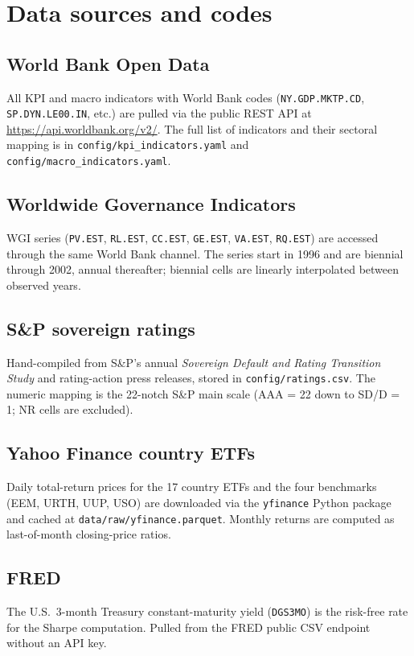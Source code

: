 \section{Data sources and codes}\label{app:data}

\subsection*{World Bank Open Data}

All KPI and macro indicators with World Bank codes (\texttt{NY.GDP.MKTP.CD}, \texttt{SP.DYN.LE00.IN}, etc.) are pulled via the public REST API at \url{https://api.worldbank.org/v2/}. The full list of indicators and their sectoral mapping is in \texttt{config/kpi\_indicators.yaml} and \texttt{config/macro\_indicators.yaml}.

\subsection*{Worldwide Governance Indicators}

WGI series (\texttt{PV.EST}, \texttt{RL.EST}, \texttt{CC.EST}, \texttt{GE.EST}, \texttt{VA.EST}, \texttt{RQ.EST}) are accessed through the same World Bank channel. The series start in 1996 and are biennial through 2002, annual thereafter; biennial cells are linearly interpolated between observed years.

\subsection*{S\&P sovereign ratings}

Hand-compiled from S\&P's annual \emph{Sovereign Default and Rating Transition Study} and rating-action press releases, stored in \texttt{config/ratings.csv}. The numeric mapping is the 22-notch S\&P main scale (AAA = 22 down to SD/D = 1; NR cells are excluded).

\subsection*{Yahoo Finance country ETFs}

Daily total-return prices for the 17 country ETFs and the four benchmarks (EEM, URTH, UUP, USO) are downloaded via the \texttt{yfinance} Python package and cached at \texttt{data/raw/yfinance.parquet}. Monthly returns are computed as last-of-month closing-price ratios.

\subsection*{FRED}

The U.S.\ 3-month Treasury constant-maturity yield (\texttt{DGS3MO}) is the risk-free rate for the Sharpe computation. Pulled from the FRED public CSV endpoint without an API key.
